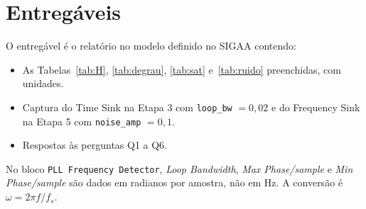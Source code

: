\documentclass[11pt,a4paper]{article}
\begin{document}
\section{Entregáveis}

O entregável é o relatório no modelo definido no SIGAA contendo:

\begin{itemize}
  \item As Tabelas~\ref{tab:H}, \ref{tab:degrau}, \ref{tab:sat} e~\ref{tab:ruido}
    preenchidas, com unidades.
  \item Captura do Time Sink na Etapa 3 com \texttt{loop\_bw} $= 0{,}02$ e do
    Frequency Sink na Etapa 5 com \texttt{noise\_amp} $= 0{,}1$.
  \item Respostas às perguntas Q1 a Q6.
\end{itemize}

\begin{atencao}
No bloco \texttt{PLL Frequency Detector}, \textit{Loop Bandwidth},
\textit{Max Phase/sample} e \textit{Min Phase/sample} são dados em radianos por
amostra, não em Hz. A conversão é $\omega = 2\pi f/f_s$.
\end{atencao}
\end{document}
